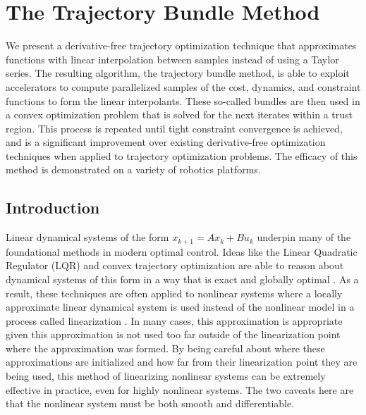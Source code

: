\graphicspath{{bundles/}}


\chapter{The Trajectory Bundle Method}
\label{sec:bundles}
We present a derivative-free trajectory optimization technique that approximates functions with linear interpolation between samples instead of using a Taylor series. The resulting algorithm, the trajectory bundle method, is able to exploit accelerators to compute parallelized samples of the cost, dynamics, and constraint functions to form the linear interpolants. These so-called bundles are then used in a convex optimization problem that is solved for the next iterates within a trust region. This process is repeated until tight constraint convergence is achieved, and is a significant improvement over existing derivative-free optimization techniques when applied to trajectory optimization problems. The efficacy of this method is demonstrated on a variety of robotics platforms.


\section{Introduction}\label{sec:bundles:introduction}
Linear dynamical systems of the form $x_{k+1} = Ax_k + Bu_k$ underpin many of the foundational methods in modern optimal control. Ideas like the Linear Quadratic Regulator (LQR) and convex trajectory optimization are able to reason about dynamical systems of this form in a way that is exact and globally optimal \cite{kalman1960,borrelli2017,boyd2004}. As a result, these techniques are often applied to nonlinear systems where a locally approximate linear dynamical system is used instead of the nonlinear model in a process called linearization \cite{slotine1991}. In many cases, this approximation is appropriate given this approximation is not used too far outside of the linearization point where the approximation was formed. By being careful about where these approximations are initialized and how far from their linearization point they are being used, this method of linearizing nonlinear systems can be extremely effective in practice, even for highly nonlinear systems.  The two caveats here are that the nonlinear system must be both smooth and differentiable. 

